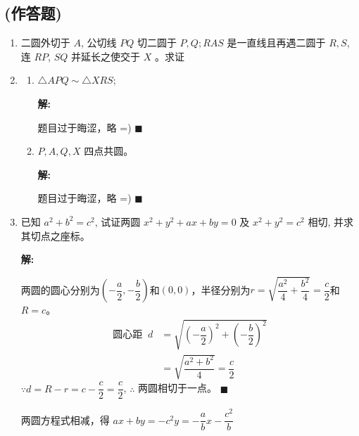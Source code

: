 \documentclass[10pt]{article}
\newcommand{\sol}{\textbf{解:} }
\begin{document}
\subsection*{(作答题)}
\begin{enumerate}[leftmargin=*]
  \item 二圆外切于 $A$, 公切线 $PQ$ 切二圆于 $P, Q ; RAS$ 是一直线且再遇二圆于 $R, S$, 连 $RP$, $S Q$ 并延长之使交于 $X$ 。求证
  \item \begin{enumerate}
          \item $\triangle APQ \sim \triangle XRS$;

                \sol{}

                题目过于晦涩，略 =) \hfill$\blacksquare$

          \item  $P, A, Q, X$ 四点共圆。

                \sol{}

                题目过于晦涩，略 =) \hfill$\blacksquare$
        \end{enumerate}

  \item 已知 $a^{2}+b^{2}=c^{2}$, 试证两圆 $x^{2}+y^{2}+a x+b y=0$ 及 $x^{2}+y^{2}=c^{2}$ 相切, 并求其切点之座标。

        \sol{}

        两圆的圆心分别为$\left(-\dfrac{a}{2}, -\dfrac{b}{2}\right)$和$(0, 0)$，半径分别为$r = \sqrt{\dfrac{a^2}{4} + \dfrac{b^2}{4}} = \dfrac{c}{2}$和$R = c$。
        \begin{align*}
          \text{圆心距 }\ d & = \sqrt{\left(-\dfrac{a}{2}\right)^2 + \left(-\dfrac{b}{2}\right)^2} \\
                         & = \sqrt{\dfrac{a^2 + b^2}{4}} = \dfrac{c}{2}
        \end{align*}
        $\because d = R - r = c - \dfrac{c}{2} = \dfrac{c}{2}$, $\therefore$ 两圆相切于一点。 \hfill$\blacksquare$

        两圆方程式相减，得 $ax + by = -c^{2} y = -\dfrac{a}{b}x - \dfrac{c^{2}}{b}$


\end{enumerate}
\end{document}
